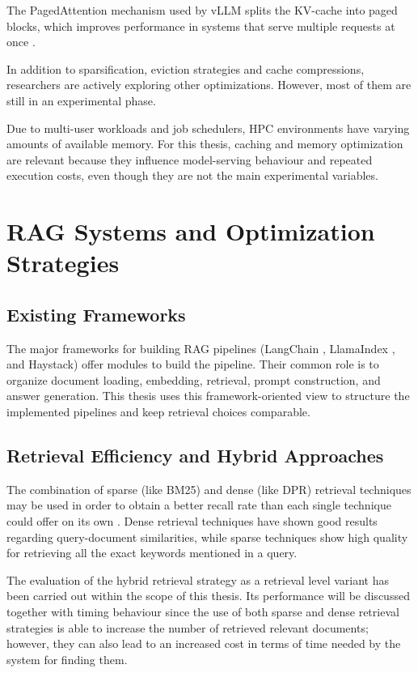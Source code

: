 The PagedAttention mechanism used by \ac{vLLM} splits the \ac{KV-cache} into paged blocks, which improves performance in systems that serve multiple requests at once \cite{kwon2023vllm}.

In addition to sparsification, eviction strategies and cache compressions, researchers are actively exploring other optimizations. However, most of them are still in an experimental phase.

Due to multi-user workloads and job schedulers, \ac{HPC} environments have varying amounts of available memory. For this thesis, caching and memory optimization are relevant because they influence model-serving behaviour and repeated execution costs, even though they are not the main experimental variables.

\section{RAG Systems and Optimization Strategies}

\subsection{Existing Frameworks}

The major frameworks for building RAG pipelines (LangChain \cite{langchain2023}, LlamaIndex \cite{llamaindex2023}, and Haystack) offer modules to build the pipeline. Their common role is to organize document loading, embedding, retrieval, prompt construction, and answer generation. This thesis uses this framework-oriented view to structure the implemented pipelines and keep retrieval choices comparable.

\subsection{Retrieval Efficiency and Hybrid Approaches}

The combination of sparse (like \ac{BM25}) and dense (like \ac{DPR}) retrieval techniques may be used in order to obtain a better recall rate than each single technique could offer on its own \cite{robertson2009bm25,karpukhin2020dpr}. Dense retrieval techniques have shown good results regarding query-document similarities, while sparse techniques show high quality for retrieving all the exact keywords mentioned in a query.

The evaluation of the hybrid retrieval strategy as a retrieval level variant has been carried out within the scope of this thesis. Its performance will be discussed together with timing behaviour since the use of both sparse and dense retrieval strategies is able to increase the number of retrieved relevant documents; however, they can also lead to an increased cost in terms of time needed by the system for finding them.


